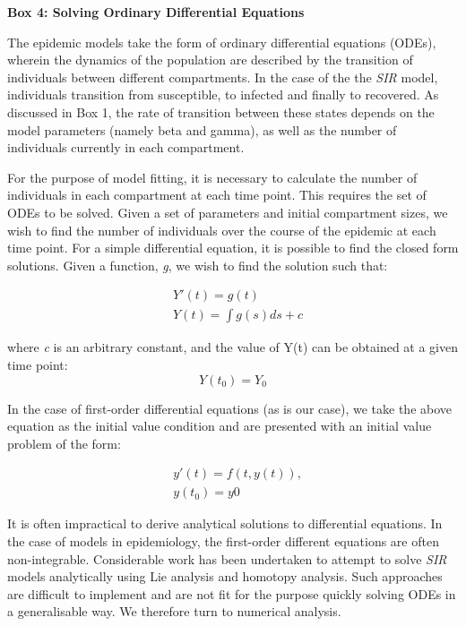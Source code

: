 \newpage
\begin{framed}
{\begin{center}{\bf Box 4: Solving Ordinary Differential Equations}\end{center}}

The epidemic models take the form of ordinary differential
equations (ODEs), wherein the dynamics of the population are described by the
transition of individuals between different compartments. In the case
of the the \emph{SIR} model, individuals transition from susceptible,
to infected and finally to recovered. As discussed in Box 1, the rate
of transition between these states depends on the model parameters
(namely beta and gamma), as well as the number of individuals
currently in each compartment. 

For the purpose of model fitting, it is necessary to calculate the
number of individuals in each compartment at each time point. This
requires the set of ODEs to be solved. Given a set of parameters and
initial compartment sizes, we wish to find the number of individuals
over the course of the epidemic at each time point. For a simple
differential equation, it is possible to find the closed form
solutions. Given a function, \emph{g}, we wish to find the solution
such that:

\begin{equation}
\begin{split}
  &Y'(t) = g(t)\\
  &Y(t) = \int g(s)ds+c
\end{split}
\end{equation}

where \emph{c} is an arbitrary constant, and the value of Y(t) can be
obtained at a given time point: \begin{equation} Y(t_0) = Y_0 \end{equation}

In the case of
first-order differential equations (as is our case), we take the above
equation as the initial value condition and are presented
with an initial value problem of the form:\cite{atkinson} 

\begin{equation}
\begin{split}
  &y'(t) = f(t,y(t)),\\
  &y(t_0) = y0
 \end{split}
 \end{equation}

It is often impractical to derive analytical solutions to
differential equations. In the case of models in epidemiology, the
first-order different equations are often
non-integrable.\cite{shabbir} Considerable work has been undertaken to attempt to solve
\emph{SIR} models analytically using Lie analysis and homotopy
analysis.\cite{nucci, khan} Such approaches are difficult to implement
and are not fit for the purpose quickly solving ODEs in a
generalisable way. We therefore turn to numerical
analysis.


\end{framed}
